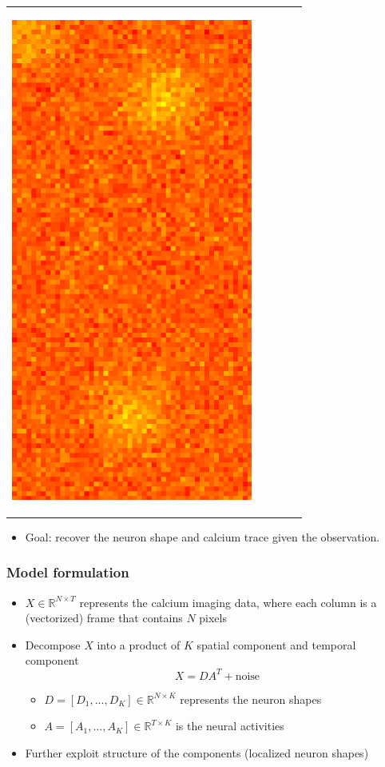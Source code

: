 \documentclass[16pt,presentation]{beamer}
\begin{document}
\begin{frame}
\begin{tabular}[t]{ccccc}
\begin{minipage}{0.06\textwidth}
\begin{center}
 \includegraphics[scale=0.2,clip = true]{figs/ROI_cartoon/fig_cartoon_frame_297.pdf}
  \end{center}
 \end{minipage}
\end{tabular}
\begin{itemize}
\item \alert{Goal}: recover the neuron shape and calcium trace given the observation.
\end{itemize}

\end{frame}


\begin{frame}
\frametitle{Model formulation}
\begin{itemize}
\item  $X \in \mathbb{R}^{N \times T}$ represents the calcium imaging data, where each column is a (vectorized) frame that contains $N$ pixels
\item Decompose $X$ into a product of $K$ \alert{spatial component} and \alert{temporal component}%
\[X = D A^T + \text{noise}\]
\begin{itemize}
\item $D = [D_1,...,D_K] \in \mathbb{R}^{N \times K}$ represents the neuron shapes
\item $A = [A_1,...,A_K] \in \mathbb{R}^{T \times K}$ is the neural activities%
\end{itemize}
\item Further exploit structure of the components (localized neuron shapes)
\end{itemize}
\end{frame}
\end{document}
